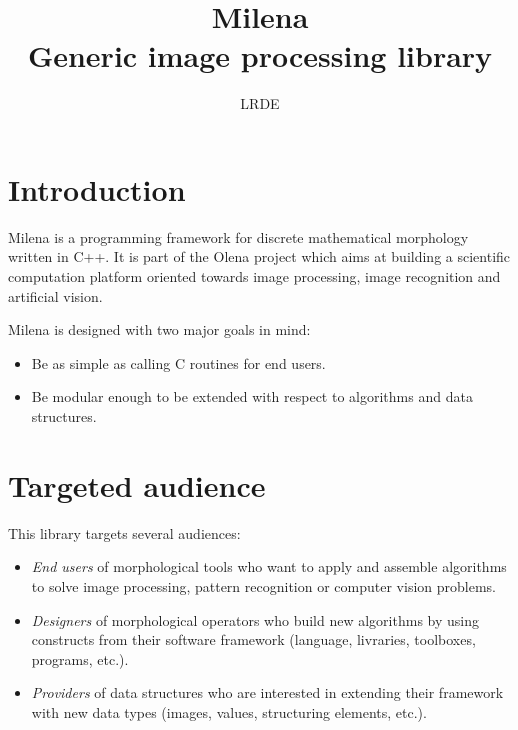 \documentclass{article}
\title{Milena\\
  \large{Generic image processing library} }
\author{LRDE}
\date{}
\begin{document}
\maketitle

\section{Introduction}
Milena is a programming framework for discrete mathematical morphology written
in C++. It is part of the Olena project which aims at building a scientific
computation platform oriented towards image processing, image recognition and
artificial vision.

Milena is designed with two major goals in mind:
\begin{itemize}
  \item Be as simple as calling C routines for end users.
  \item Be modular enough to be extended with respect to algorithms and data
	structures.
\end{itemize}


\section{Targeted audience}
This library targets several audiences:
\begin{itemize}

  \item \textit{End users} of morphological tools who want to apply and assemble
  algorithms to solve image processing, pattern recognition or computer vision
  problems.
  \item \textit{Designers} of morphological operators who build new algorithms
  by using constructs from their software framework (language, livraries,
      toolboxes, programs, etc.).
  \item \textit{Providers} of data structures who are interested in extending
  their framework with new data types (images, values, structuring elements,
      etc.).

\end{itemize}

\end{document}
